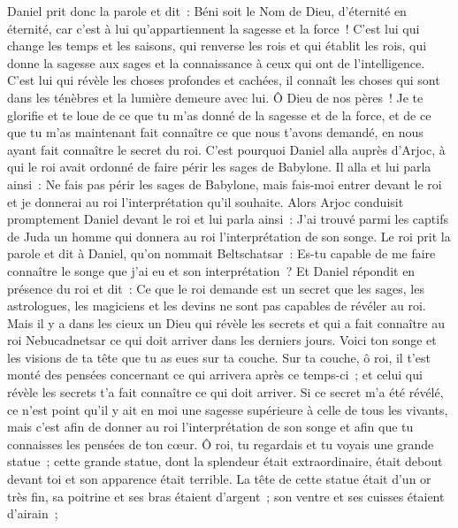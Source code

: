 \begin{multicols}{2}
Daniel prit donc la parole et dit~: Béni soit le Nom de Dieu, d'éternité en éternité, car c'est à lui qu'appartiennent la sagesse et la force~!
C'est lui qui change les temps et les saisons, qui renverse les rois et qui établit les rois, qui donne la sagesse aux sages et la connaissance à ceux qui ont de l'intelligence.
C'est lui qui révèle les choses profondes et cachées, il connaît les choses qui sont dans les ténèbres et la lumière demeure avec lui.
Ô Dieu de nos pères~! Je te glorifie et te loue de ce que tu m'as donné de la sagesse et de la force, et de ce que tu m'as maintenant fait connaître ce que nous t'avons demandé, en nous ayant fait connaître le secret du roi.
C'est pourquoi Daniel alla auprès d'Arjoc, à qui le roi avait ordonné de faire périr les sages de Babylone. Il alla et lui parla ainsi~: Ne fais pas périr les sages de Babylone, mais fais-moi entrer devant le roi et je donnerai au roi l'interprétation qu'il souhaite.
Alors Arjoc conduisit promptement Daniel devant le roi et lui parla ainsi~: J'ai trouvé parmi les captifs de Juda un homme qui donnera au roi l'interprétation de son songe.
Le roi prit la parole et dit à Daniel, qu'on nommait Beltschatsar~: Es-tu capable de me faire connaître le songe que j'ai eu et son interprétation~?
Et Daniel répondit en présence du roi et dit~: Ce que le roi demande est un secret que les sages, les astrologues, les magiciens et les devins ne sont pas capables de révéler au roi.
Mais il y a dans les cieux un Dieu qui révèle les secrets et qui a fait connaître au roi Nebucadnetsar ce qui doit arriver dans les derniers jours. Voici ton songe et les visions de ta tête que tu as eues sur ta couche.
Sur ta couche, ô roi, il t'est monté des pensées concernant ce qui arrivera après ce temps-ci~; et celui qui révèle les secrets t'a fait connaître ce qui doit arriver.
Si ce secret m'a été révélé, ce n'est point qu'il y ait en moi une sagesse supérieure à celle de tous les vivants, mais c'est afin de donner au roi l'interprétation de son songe et afin que tu connaisses les pensées de ton cœur.
Ô roi, tu regardais et tu voyais une grande statue~; cette grande statue, dont la splendeur était extraordinaire, était debout devant toi et son apparence était terrible.
La tête de cette statue était d'un or très fin, sa poitrine et ses bras étaient d'argent~; son ventre et ses cuisses étaient d'airain~;

\end{multicols}
